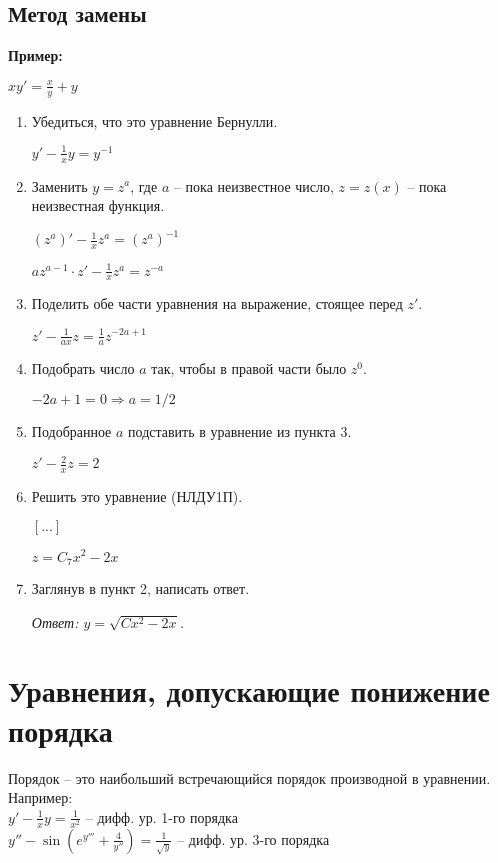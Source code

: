 \documentclass[10pt, a4paper]{article}
\begin{document}
\subsection{Метод замены}
\textbf{Пример:}
\par $xy' = \frac{x}{y} + y$
\begin{enumerate}
    \item Убедиться, что это уравнение Бернулли.
        \par $y' - \frac{1}{x}y = y^{-1}$
    \item Заменить $y = z^a$, где $a$ -- пока неизвестное число, $z = z(x)$ -- пока неизвестная функция.
        \par $(z^a)' - \frac{1}{x}z^a = (z^a)^{-1}$
        \par{}
        \par $az^{a - 1} \cdot z' - \frac{1}{x}z^a = z^{-a}$
    \item Поделить обе части уравнения на выражение, стоящее перед $z'$.
        \par $z' - \frac{1}{ax}z = \frac{1}{a}z^{-2a + 1}$
    \item Подобрать число $a$ так, чтобы в правой части было $z^0$.
        \par $-2a + 1 = 0 \Rightarrow a = 1/2$
    \item Подобранное $a$ подставить в уравнение из пункта 3.
        \par $z' - \frac{2}{x}z = 2$
    \item Решить это уравнение (НЛДУ1П).
        \par $[...]$
        \par $z = C_{7}x^2-2x$
    \item Заглянув в пункт 2, написать ответ.
        \par\textit{Ответ: $y = \sqrt{Cx^2 - 2x}$.}
\end{enumerate}


\section*{Уравнения, допускающие понижение порядка}
Порядок -- это наибольший встречающийся порядок производной в уравнении. \\
Например: \\
$y' - \frac{1}{x}y = \frac{1}{x^2}$ -- дифф. ур. 1-го порядка \\
$y'' - \sin{(e^{y'''} + \frac{4}{y''})} = \frac{1}{\sqrt{y}}$ -- дифф. ур. 3-го порядка
\end{document}
